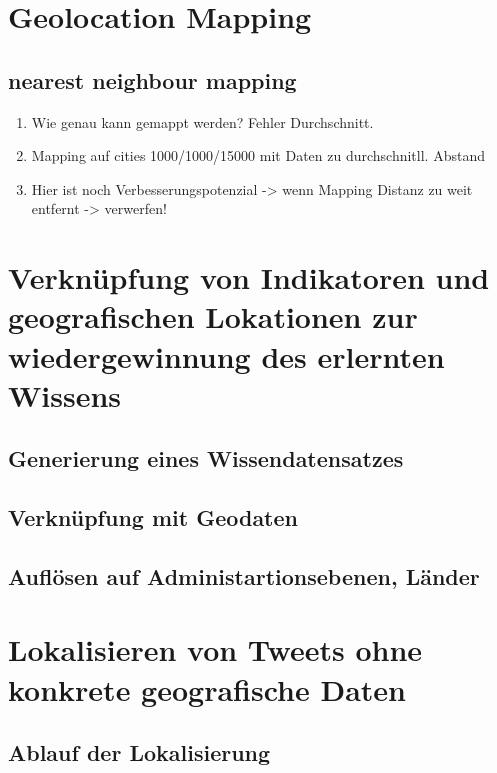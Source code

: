 \section{Geolocation Mapping}

	\subsection{nearest neighbour mapping}
		\begin{enumerate}
			\item {} Wie genau kann gemappt werden? Fehler Durchschnitt. 
			\item Mapping auf cities 1000/1000/15000 mit Daten zu durchschnitll. Abstand
			\item Hier ist noch Verbesserungspotenzial -> wenn Mapping Distanz zu weit entfernt -> verwerfen! 
		\end{enumerate} 

\section{Verknüpfung von Indikatoren und geografischen Lokationen zur wiedergewinnung des erlernten Wissens}
	
	\subsection{Generierung eines Wissendatensatzes}

	\subsection{Verknüpfung mit Geodaten}

	\subsection{Auflösen auf Administartionsebenen, Länder}

\section{Lokalisieren von Tweets ohne konkrete geografische Daten}
	
	\subsection{Ablauf der Lokalisierung}
	
